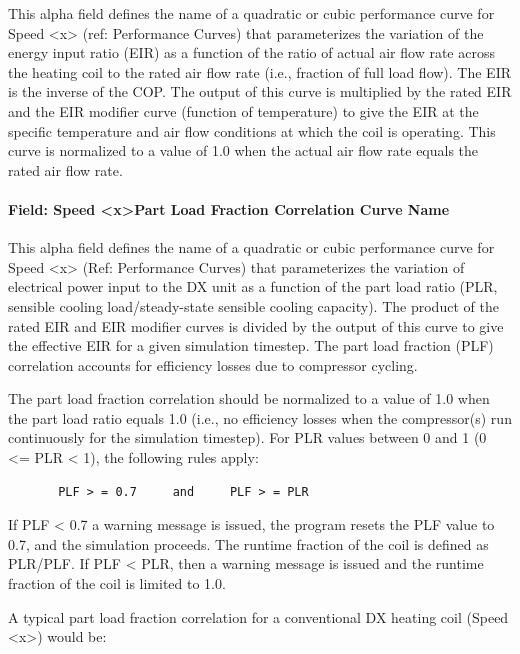 This alpha field defines the name of a quadratic or cubic performance curve for Speed \textless{}x\textgreater{} (ref: Performance Curves) that parameterizes the variation of the energy input ratio (EIR) as a function of the ratio of actual air flow rate across the heating coil to the rated air flow rate (i.e., fraction of full load flow). The EIR is the inverse of the COP. The output of this curve is multiplied by the rated EIR and the EIR modifier curve (function of temperature) to give the EIR at the specific temperature and air flow conditions at which the coil is operating. This curve is normalized to a value of 1.0 when the actual air flow rate equals the rated air flow rate.

\paragraph{Field: Speed \textless{}x\textgreater{}Part Load Fraction Correlation Curve Name}\label{field-speed-xpart-load-fraction-correlation-curve-name}

This alpha field defines the name of a quadratic or cubic performance curve for Speed \textless{}x\textgreater{} (Ref: Performance Curves) that parameterizes the variation of electrical power input to the DX unit as a function of the part load ratio (PLR, sensible cooling load/steady-state sensible cooling capacity). The product of the rated EIR and EIR modifier curves is divided by the output of this curve to give the effective EIR for a given simulation timestep. The part load fraction (PLF) correlation accounts for efficiency losses due to compressor cycling.

The part load fraction correlation should be normalized to a value of 1.0 when the part load ratio equals 1.0 (i.e., no efficiency losses when the compressor(s) run continuously for the simulation timestep). For PLR values between 0 and 1 (0 \textless{}= PLR \textless{} 1), the following rules apply:

\begin{lstlisting}
       PLF > = 0.7     and     PLF > = PLR
\end{lstlisting}

If PLF \textless{} 0.7 a warning message is issued, the program resets the PLF value to 0.7, and the simulation proceeds. The runtime fraction of the coil is defined as PLR/PLF. If PLF \textless{} PLR, then a warning message is issued and the runtime fraction of the coil is limited to 1.0.

A typical part load fraction correlation for a conventional DX heating coil (Speed \textless{}x\textgreater{}) would be:

